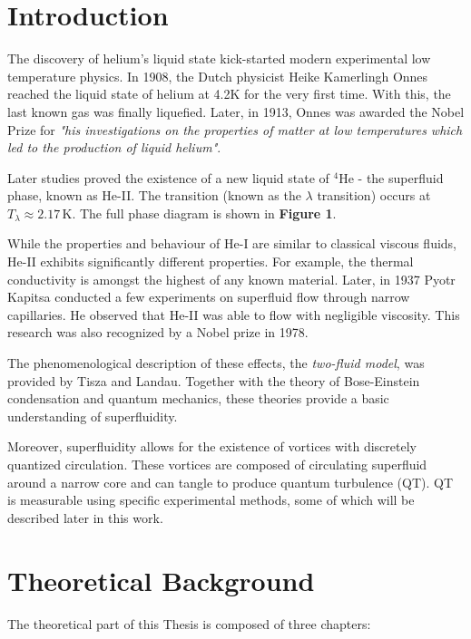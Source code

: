 \documentclass[a4paper, 12pt]{report}
\newcommand{\unit}[1]{\,\mathrm{#1}}
\newcommand{\He}{{}^4\mathrm{He}}
\newcommand{\<}{\langle}
\renewcommand{\>}{\rangle}
\begin{document}
\chapter*{Introduction}

The discovery of helium's liquid state kick-started modern experimental  low temperature physics. In 1908, the Dutch physicist Heike Kamerlingh Onnes reached the liquid state of helium at 4.2K for the very first time. With this, the last known gas was finally liquefied. Later, in 1913, Onnes was awarded the Nobel Prize for \textit{"his investigations on the properties of matter at low temperatures which led to the production of liquid helium"}.

Later studies proved the existence of a new liquid state of $ \He $ - the superfluid phase, known as He-II. The transition (known as the $ \lambda$ transition) occurs at $ T_{\lambda} \approx 2.17\unit{K} $. The full phase diagram is shown in {\sffamily\textbf{Figure 1}}.

While the properties and behaviour of He-I are similar to classical viscous fluids, He-II exhibits significantly different properties. For example, the thermal conductivity is amongst the highest of any known material. Later, in 1937 Pyotr Kapitsa\cite{kapitsa} conducted a few experiments on superfluid flow through narrow capillaries. He observed that He-II was able to flow with negligible viscosity. This research was also recognized by a Nobel prize in 1978.

The phenomenological description of these effects, the \textit{two-fluid model}, was provided by Tisza and Landau. Together with the theory of Bose-Einstein condensation and quantum mechanics, these theories provide a basic understanding of superfluidity.

Moreover, superfluidity allows for the existence of vortices with discretely quantized circulation. These vortices are composed of circulating superfluid around a narrow core and can tangle to produce quantum turbulence (QT). QT is measurable using specific experimental methods, some of which will be described later in this work.




\newpage
\chapter{Theoretical Background}

The theoretical part of this Thesis is composed of three chapters:
\end{document}
